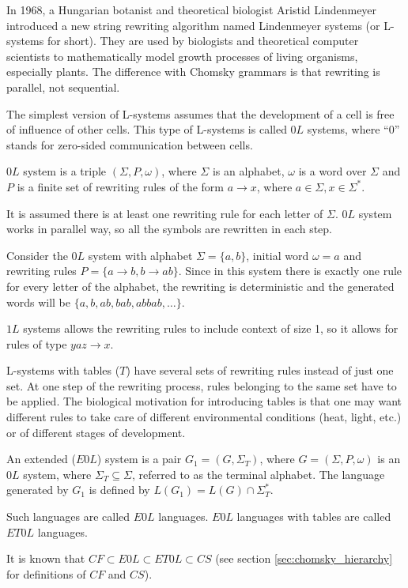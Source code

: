In 1968, a Hungarian botanist and theoretical biologist Aristid Lindenmeyer introduced \cite{Lindenmeyer68} a new string rewriting algorithm named Lindenmeyer systems (or L-systems for short). They are used by biologists and theoretical computer scientists to mathematically model growth processes of living organisms, especially plants. The difference with Chomsky grammars is that rewriting is parallel, not sequential.

The simplest version of L-systems assumes that the development of a cell is free of influence of other cells.
This type of L-systems is called $0L$ systems, where ``0'' stands for zero-sided communication between cells.

\begin{definition}
$0L$ system is a triple $(\Sigma, P, \omega)$, where $\Sigma$ is an alphabet, $\omega$ is a word over $\Sigma$ and $P$ is a finite set of rewriting rules of the form $a\rightarrow x$, where $a\in\Sigma, x\in\Sigma^*$.
\end{definition}

It is assumed there is at least one rewriting rule for each letter of $\Sigma$. $0L$ system works in parallel way, so all the symbols are rewritten in each step.

\begin{example}
Consider the $0L$ system with alphabet $\Sigma = \{a,b\}$, initial word $\omega = a$ and rewriting rules $P = \{a\rightarrow b, b\rightarrow ab\}$.
Since in this system there is exactly one rule for every letter of the alphabet, the rewriting is deterministic and the generated words will be $\{a, b, ab, bab, abbab, \dots \}$. 
\end{example}

$1L$ systems allows the rewriting rules to include context of size 1, so it allows for rules of type $yaz\rightarrow x$.

L-systems with tables ($T$) have several sets of rewriting rules instead of just one set. At one step of the rewriting process, rules belonging to the same set have to be applied. The biological motivation for introducing tables is that one may want different rules to take care of different environmental conditions (heat, light, etc.) or of different stages of development.

\begin{definition}
An extended ($E0L$) system is a pair $G_1 = (G, \Sigma_T)$, where $G = (\Sigma, P, \omega)$ is an $0L$ system, where $\Sigma_T \subseteq \Sigma$, referred to as the terminal alphabet. The language generated by $G_1$ is defined by $L(G_1) = L(G)\cap \Sigma_T^*$.
\end{definition}

Such languages are called $E0L$ languages. $E0L$ languages with tables are called $ET0L$ languages.

It is known that $CF \subset E0L \subset ET0L \subset CS$ (see section \ref{sec:chomsky_hierarchy} for definitions of $CF$ and $CS$).

